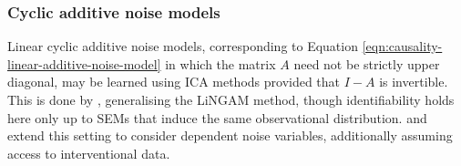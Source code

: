 


\subsubsection{Cyclic additive noise models}

Linear cyclic additive noise models, corresponding to Equation \ref{eqn:causality-linear-additive-noise-model} in which the matrix $A$ need not be strictly upper diagonal, may be learned using ICA methods provided that $I-A$ is invertible.
This is done by \cite{lacerda2012discovering}, generalising the LiNGAM method, though identifiability holds here only up to SEMs that induce the same observational distribution.
\cite{scheines2010combining, hyttinen2010causal, hyttinen2012learning} and \cite{hyttinen2013discovering} extend this setting to consider dependent noise variables, additionally assuming access to interventional data.


